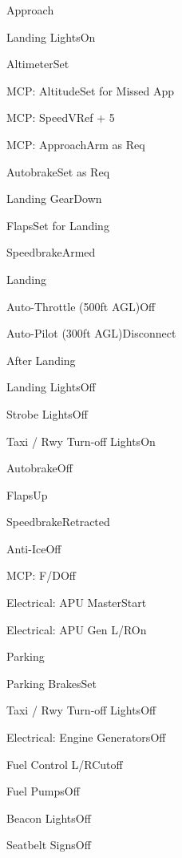\documentclass[sim-use]{checklist}
\begin{document}
\begin{checklist}{Approach}
  \item{Landing Lights}{On}
  \item{Altimeter}{Set}
  \item{MCP: Altitude}{Set for Missed App}
  \item{MCP: Speed}{VRef + 5}
  \item{MCP: Approach}{Arm as Req}
  \item{Autobrake}{Set as Req}
  \item{Landing Gear}{Down}
  \item{Flaps}{Set for Landing}
  \item{Speedbrake}{Armed} 
\end{checklist}

\begin{checklist}{Landing}
  \item{Auto-Throttle (500ft AGL)}{Off}
  \item{Auto-Pilot (300ft AGL)}{Disconnect}
\end{checklist}

\begin{checklist}{After Landing}
  \item{Landing Lights}{Off}
  \item{Strobe Lights}{Off}
  \item{Taxi / Rwy Turn-off Lights}{On}
  \item{Autobrake}{Off}
  \item{Flaps}{Up}
  \item{Speedbrake}{Retracted}
  \item{Anti-Ice}{Off}
  \item{MCP: F/D}{Off}
  \item{Electrical: APU Master}{Start}
  \item{Electrical: APU Gen L/R}{On}
\end{checklist}

\begin{checklist}{Parking}
  \item{Parking Brakes}{Set}
  \item{Taxi / Rwy Turn-off Lights}{Off}
  \item{Electrical: Engine Generators}{Off}
  \item{Fuel Control L/R}{Cutoff}
  \item{Fuel Pumps}{Off}
  \item{Beacon Lights}{Off}
  \item{Seatbelt Signs}{Off}
\end{checklist}
\end{document}
